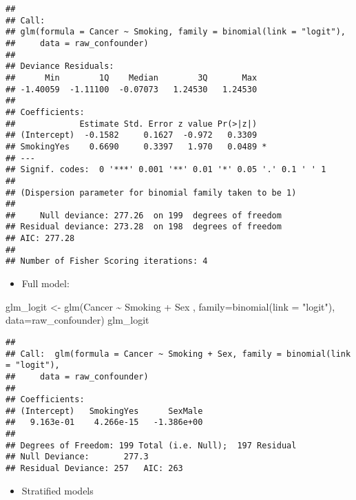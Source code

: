 \documentclass[
]{book}
\newenvironment{Shaded}{\begin{snugshade}}{\end{snugshade}}
\newcommand{\AttributeTok}[1]{\textcolor[rgb]{0.77,0.63,0.00}{#1}}
\newcommand{\DocumentationTok}[1]{\textcolor[rgb]{0.56,0.35,0.01}{\textbf{\textit{#1}}}}
\newcommand{\FunctionTok}[1]{\textcolor[rgb]{0.00,0.00,0.00}{#1}}
\newcommand{\NormalTok}[1]{#1}
\newcommand{\OtherTok}[1]{\textcolor[rgb]{0.56,0.35,0.01}{#1}}
\newcommand{\SpecialCharTok}[1]{\textcolor[rgb]{0.00,0.00,0.00}{#1}}
\newcommand{\StringTok}[1]{\textcolor[rgb]{0.31,0.60,0.02}{#1}}
\providecommand{\tightlist}{%
  \setlength{\itemsep}{0pt}\setlength{\parskip}{0pt}}
\begin{document}
\begin{verbatim}
## 
## Call:
## glm(formula = Cancer ~ Smoking, family = binomial(link = "logit"), 
##     data = raw_confounder)
## 
## Deviance Residuals: 
##      Min        1Q    Median        3Q       Max  
## -1.40059  -1.11100  -0.07073   1.24530   1.24530  
## 
## Coefficients:
##             Estimate Std. Error z value Pr(>|z|)  
## (Intercept)  -0.1582     0.1627  -0.972   0.3309  
## SmokingYes    0.6690     0.3397   1.970   0.0489 *
## ---
## Signif. codes:  0 '***' 0.001 '**' 0.01 '*' 0.05 '.' 0.1 ' ' 1
## 
## (Dispersion parameter for binomial family taken to be 1)
## 
##     Null deviance: 277.26  on 199  degrees of freedom
## Residual deviance: 273.28  on 198  degrees of freedom
## AIC: 277.28
## 
## Number of Fisher Scoring iterations: 4
\end{verbatim}

\begin{itemize}
\tightlist
\item
  Full model:
\end{itemize}

\begin{Shaded}
\begin{Highlighting}[]
\NormalTok{glm\_logit }\OtherTok{\textless{}{-}} \FunctionTok{glm}\NormalTok{(Cancer }\SpecialCharTok{\textasciitilde{}}\NormalTok{ Smoking }\SpecialCharTok{+}\NormalTok{ Sex , }\AttributeTok{family=}\FunctionTok{binomial}\NormalTok{(}\AttributeTok{link =} \StringTok{"logit"}\NormalTok{), }\AttributeTok{data=}\NormalTok{raw\_confounder)}
\NormalTok{glm\_logit}
\end{Highlighting}
\end{Shaded}

\begin{verbatim}
## 
## Call:  glm(formula = Cancer ~ Smoking + Sex, family = binomial(link = "logit"), 
##     data = raw_confounder)
## 
## Coefficients:
## (Intercept)   SmokingYes      SexMale  
##   9.163e-01    4.266e-15   -1.386e+00  
## 
## Degrees of Freedom: 199 Total (i.e. Null);  197 Residual
## Null Deviance:       277.3 
## Residual Deviance: 257   AIC: 263
\end{verbatim}

\begin{itemize}
\tightlist
\item
  Stratified models
\end{itemize}

\begin{Shaded}
\end{Shaded}
\end{document}
